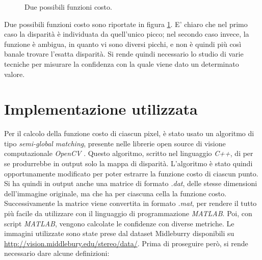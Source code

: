 \documentclass[12pt]{report}
\begin{document}
			
		\begin{figure}[<h>]
			\centering
			 \quad
			\caption{Due possibili funzioni costo.}
			\label{fig:costi}
		\end{figure}	
		
		\noindent Due possibili funzioni costo sono riportate in figura \ref{fig:costi}. E' chiaro che nel primo caso la disparità  è individuata da quell'unico picco; nel secondo caso invece, la funzione è ambigua, in quanto vi sono diversi picchi, e non è quindi più così banale trovare l'esatta disparità. Si rende quindi necessario lo studio di varie tecniche per misurare la confidenza con la quale viene dato un determinato valore.
		
		
		\section{Implementazione utilizzata}
		\label{sec:implementazione}
		
			Per il calcolo della funzione costo di ciascun pixel, è stato usato un algoritmo di tipo \textit{semi-global matching}, presente nelle librerie open source di visione computazionale \textit{OpenCV} \cite{opencv}. Questo algoritmo, scritto nel linguaggio \textit{C++}, di per se produrrebbe in output solo la mappa di disparità. L'algoritmo è stato quindi opportunamente modificato per poter estrarre la funzione costo di ciascun punto. Si ha quindi in output anche una matrice di formato \textit{.dat}, delle stesse dimensioni dell'immagine originale, ma che ha per ciascuna cella la funzione costo. Successivamente la matrice viene convertita in formato \textit{.mat}, per rendere il tutto più facile da utilizzare con il linguaggio di programmazione \textit{MATLAB}. Poi, con script \textit{MATLAB}, vengono calcolate le confidenze con diverse metriche. Le immagini utilizzate sono state prese dal dataset Midleburry \cite{dataset_2006_1,dataset_2006_2} disponibili su \url{http://vision.middlebury.edu/stereo/data/}. \newline
			Prima di proseguire però, si rende necessario dare alcune definizioni:  		
		
\end{document}
